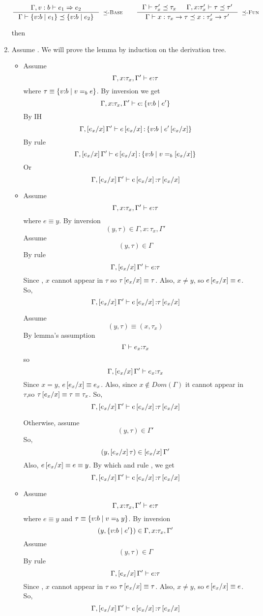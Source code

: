 \begin{enumerate}
$$
\inference{
	\issubref{\Gamma, v:b}{e_1}{e_2}
}{
	\issubtype{\Gamma}{\tref{v}{b}{e_1}}{\tref{v}{b}{e_2}}
}[\rsubbase]
\qquad
\inference{
	\issubtype{\Gamma}{\tau'_x}{\tau_x} &&
	\issubtype{\Gamma, x \colon \tau'_x}{\tau}{\tau'}
}{
	\issubtype{\Gamma}{x:\tau_x \rightarrow \tau}{x:\tau'_x \rightarrow \tau'}
}[\rsubfun]
$$

	
	then
\item \label{proof:sub:type} 
Assume 
	.
We will prove the lemma by induction on the derivation tree.
\begin{itemize}
\item \rtexact Assume
	$$\hastype{\Gamma, x\colon\tau_x, \Gamma'}{e}{\tau}$$
where $\tau \equiv \tref{v}{b}{v \eqb{b} e}$.
By inversion we get
	$$\hastype{\Gamma, x\colon\tau_x, \Gamma'}{e}{\tref{v}{b}{e'}}$$
By IH
	$$\hastype{\Gamma, \sub{x}{e_x} \Gamma'}{e\sub{x}{e_x}}{\tref{v}{b}{e'\sub{x}{e_x}}}$$
By rule \rtexact
	$$\hastype{\Gamma, \sub{x}{e_x} \Gamma'}{e\sub{x}{e_x}}{\tref{v}{b}{v \eqb{b} \sub{x}{e_x}}}$$
Or
	$$\hastype{\Gamma, \sub{x}{e_x} \Gamma'}{e\sub{x}{e_x}}{\tau\sub{x}{e_x}}$$
\item \rtvar Assume 
	$$\hastype{\Gamma, x\colon\tau_x, \Gamma'}{e}{\tau}$$
where $e \equiv y$.
By inversion 
$$(y,\tau )\in \Gamma, x\colon\tau_x, \Gamma'$$
Assume
$$(y,\tau)\in \Gamma$$
By rule \rtvar
$$\hastype{\Gamma,\sub{x}{e_x}\Gamma'}{e}{\tau}$$
Since \iswellformed{}{\Gamma}, $x$ cannot appear in $\tau$
so $\tau\sub{x}{e_x}\equiv\tau$.
Also, $x\neq y$, so $e\sub{x}{e_x}\equiv e$.
So,
$$\hastype{\Gamma,\sub{x}{e_x}\Gamma'}{e\sub{x}{e_x}}{\tau\sub{x}{e_x}}$$

Assume
$$(y,\tau) \equiv (x,\tau _x)$$
By lemma's assumption 
$$\hastype{\Gamma}{e_x}{\tau_x}$$
so
$$\hastype{\Gamma,\sub{x}{e_x}\Gamma'}{e_x}{\tau_x}$$
Since $x = y$, $e\sub{x}{e_x} \equiv e_x$.
Also, since $x \notin Dom(\Gamma)$ 
it cannot appear in $\tau$,so
$\tau\sub{x}{e_x} \equiv \tau \equiv \tau_x$.
So,
$$\hastype{\Gamma,\sub{x}{e_x}\Gamma'}{e\sub{x}{e_x}}{\tau\sub{x}{e_x}}$$

Otherwise, assume
$$(y,\tau)\in \Gamma'$$
So,
$$(y,\sub{x}{e_x}\tau)\in \sub{x}{e_x}\Gamma'$$
Also, $e\sub{x}{e_x}\equiv e \equiv y$.
By which and rule \rtvar, we get
$$\hastype{\Gamma,\sub{x}{e_x}\Gamma'}{e\sub{x}{e_x}}{\tau\sub{x}{e_x}}$$

\item \rtvarbase
Assume 
	$$\hastype{\Gamma, x\colon\tau_x, \Gamma'}{e}{\tau}$$
where $e \equiv y$ and $\tau\equiv\tref{v}{b}{v\eqb{b} y}$.
By inversion 
$$(y,\tref{v}{b}{e'})\in \Gamma, x\colon\tau_x, \Gamma'$$
Assume
$$(y,\tau)\in \Gamma$$
By rule \rtvarbase
$$\hastype{\Gamma,\sub{x}{e_x}\Gamma'}{e}{\tau}$$
Since \iswellformed{}{\Gamma}, $x$ cannot appear in $\tau$
so $\tau\sub{x}{e_x}\equiv\tau$.
Also, $x\neq y$, so $e\sub{x}{e_x}\equiv e$.
So,
$$\hastype{\Gamma,\sub{x}{e_x}\Gamma'}{e\sub{x}{e_x}}{\tau\sub{x}{e_x}}$$


\end{itemize}
\end{enumerate}
